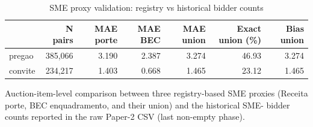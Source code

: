 \begin{table}[htbp]
\centering
\begin{threeparttable}
\caption{SME proxy validation: registry vs historical bidder counts}
\label{tab:v3_sme_proxy_audit}
\footnotesize
\setlength{\tabcolsep}{4pt}
\begin{tabular}{lrrrrrr}
\toprule
 & N pairs & MAE porte & MAE BEC & MAE union & Exact union (\%) & Bias union \\
\midrule
pregao & 385,066 & 3.190 & 2.387 & 3.274 & 46.93 & 3.274 \\
convite & 234,217 & 1.403 & 0.668 & 1.465 & 23.12 & 1.465 \\
\bottomrule
\end{tabular}
\begin{tablenotes}\footnotesize
\item Auction-item-level comparison between three registry-based SME proxies
(Receita porte, BEC enquadramento, and their union) and the historical SME-
bidder counts reported in the raw Paper-2 CSV (last non-empty phase).
\end{tablenotes}
\end{threeparttable}
\end{table}
